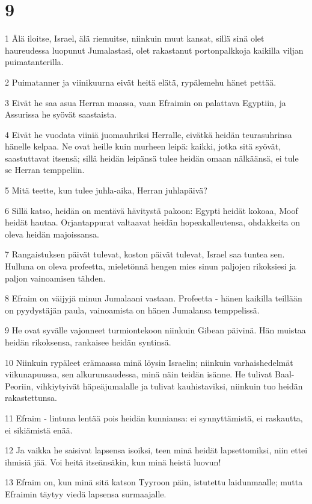 \chapter{9}

\par 1 Älä iloitse, Israel, älä riemuitse, niinkuin muut kansat, sillä sinä olet haureudessa luopunut Jumalastasi, olet rakastanut portonpalkkoja kaikilla viljan puimatanterilla.
\par 2 Puimatanner ja viinikuurna eivät heitä elätä, rypälemehu hänet pettää.
\par 3 Eivät he saa asua Herran maassa, vaan Efraimin on palattava Egyptiin, ja Assurissa he syövät saastaista.
\par 4 Eivät he vuodata viiniä juomauhriksi Herralle, eivätkä heidän teurasuhrinsa hänelle kelpaa. Ne ovat heille kuin murheen leipä: kaikki, jotka sitä syövät, saastuttavat itsensä; sillä heidän leipänsä tulee heidän omaan nälkäänsä, ei tule se Herran temppeliin.
\par 5 Mitä teette, kun tulee juhla-aika, Herran juhlapäivä?
\par 6 Sillä katso, heidän on mentävä hävitystä pakoon: Egypti heidät kokoaa, Moof heidät hautaa. Orjantappurat valtaavat heidän hopeakalleutensa, ohdakkeita on oleva heidän majoissansa.
\par 7 Rangaistuksen päivät tulevat, koston päivät tulevat, Israel saa tuntea sen. Hulluna on oleva profeetta, mieletönnä hengen mies sinun paljojen rikoksiesi ja paljon vainoamisen tähden.
\par 8 Efraim on väijyjä minun Jumalaani vastaan. Profeetta - hänen kaikilla teillään on pyydystäjän paula, vainoamista on hänen Jumalansa temppelissä.
\par 9 He ovat syvälle vajonneet turmiontekoon niinkuin Gibean päivinä. Hän muistaa heidän rikoksensa, rankaisee heidän syntinsä.
\par 10 Niinkuin rypäleet erämaassa minä löysin Israelin; niinkuin varhaishedelmät viikunapuussa, sen alkurunsaudessa, minä näin teidän isänne. He tulivat Baal-Peoriin, vihkiytyivät häpeäjumalalle ja tulivat kauhistaviksi, niinkuin tuo heidän rakastettunsa.
\par 11 Efraim - lintuna lentää pois heidän kunniansa: ei synnyttämistä, ei raskautta, ei sikiämistä enää.
\par 12 Ja vaikka he saisivat lapsensa isoiksi, teen minä heidät lapsettomiksi, niin ettei ihmisiä jää. Voi heitä itseänsäkin, kun minä heistä luovun!
\par 13 Efraim on, kun minä sitä katson Tyyroon päin, istutettu laidunmaalle; mutta Efraimin täytyy viedä lapsensa surmaajalle.
